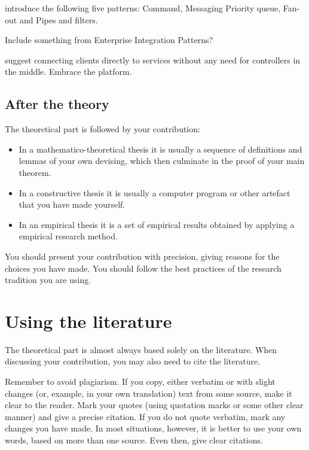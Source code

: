 \documentclass[utf8,english]{gradu3}
\begin{document}
\textcite{sbarski2017serverless} introduce the following five patterns: Command, Messaging Priority queue, Fan-out and Pipes and filters.

Include something from Enterprise Integration Patterns?

\textcite{adzic2017serverless} suggest connecting clients directly to services without any need for controllers in the middle. Embrace the platform.




\section{After the theory}

The theoretical part is followed by your contribution:
\begin{itemize}
\item In a mathematico-theoretical thesis it is usually a sequence of
  definitions and lemmas of your own devising, which then culminate in
  the proof of your main theorem.
\item In a constructive thesis it is usually a computer program or
  other artefact that you have made yourself.
\item In an empirical thesis it is a set of empirical results obtained
  by applying a empirical research method.
\end{itemize}

You should present your contribution with precision, giving reasons
for the choices you have made.  You should follow the best practices
of the research tradition you are using.

\chapter{Using the literature}

The theoretical part is almost always based solely on the literature.
When discussing your contribution, you may also need to cite the
literature.

Remember to avoid plagiarism.  If you copy, either verbatim or with
slight changes (or, example, in your own translation) text from some
source, make it clear to the reader.  Mark your quotes (using
quotation marks or some other clear manner) and give a precise
citation.  If you do not quote verbatim, mark any changes you have
made.  In most situations, however, it is better to use your own
words, based on more than one source.  Even then, give clear
citations.
\end{document}
